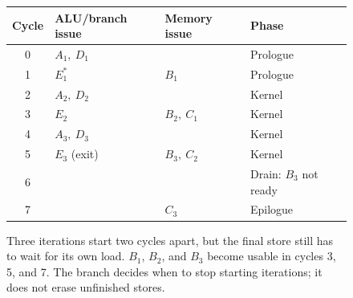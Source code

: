 \begin{figure}[htbp]
  \centering
  \begin{tabular}{clll}
    \toprule
    Cycle & ALU/branch issue & Memory issue & Phase \\
    \midrule
    0 & $A_1,\ D_1$ & & Prologue \\
    1 & $E_1^\ast$ & $B_1$ & Prologue \\
    2 & $A_2,\ D_2$ & & Kernel \\
    3 & $E_2$ & $B_2,\ C_1$ & Kernel \\
    4 & $A_3,\ D_3$ & & Kernel \\
    5 & $E_3$ (exit) & $B_3,\ C_2$ & Kernel \\
    6 & & & Drain: $B_3$ not ready \\
    7 & & $C_3$ & Epilogue \\
    \bottomrule
  \end{tabular}
  \caption{Three iterations start two cycles apart, but the final store still has to wait for its own load. $B_1$, $B_2$, and $B_3$ become usable in cycles 3, 5, and 7. The branch decides when to stop starting iterations; it does not erase unfinished stores.}
  \label{fig:software-pipeline-three-iterations}
\end{figure}
